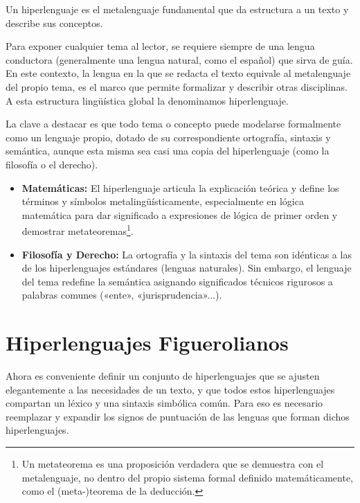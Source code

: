 \documentclass[12pt]{report}
\begin{document}
	\begin{minidefin}
		Un hiperlenguaje es el metalenguaje fundamental que da estructura a un texto y describe sus conceptos.
	\end{minidefin}
	
	Para exponer cualquier tema al lector, se requiere siempre de una lengua conductora (generalmente una lengua natural, como el español) que sirva de guía. En este contexto, la lengua en la que se redacta el texto equivale al metalenguaje del propio tema, es el marco que permite formalizar y describir otras disciplinas. A esta estructura lingüística global la denominamos hiperlenguaje.
	
	La clave a destacar es que todo tema o concepto puede modelarse formalmente como un lenguaje propio, dotado de su correspondiente ortografía, sintaxis y semántica, aunque esta misma sea casi una copia del hiperlenguaje (como la filosofía o el derecho).
	
	\begin{subminibloque}[Ejemplos]
		\begin{itemize}
			\item \textbf{Matemáticas:} 
			El hiperlenguaje articula la explicación teórica y define los términos y símbolos metalingüísticamente, especialmente en lógica matemática para dar significado a expresiones de lógica de primer orden y demostrar metateoremas\footnote{Un metateorema es una proposición verdadera que se demuestra con el metalenguaje, no dentro del propio sistema formal definido matemáticamente, como el (meta-)teorema de la deducción.}.
			
			\item \textbf{Filosofía y Derecho:} 
			La ortografía y la sintaxis del tema son idénticas a las de los hiperlenguajes estándares (lenguas naturales). Sin embargo, el lenguaje del tema redefine la semántica asignando significados técnicos rigurosos a palabras comunes («ente», «jurisprudencia»...).
		\end{itemize}
	\end{subminibloque}

	
	
	
	\section{Hiperlenguajes Figuerolianos}
	
	Ahora es conveniente definir un conjunto de hiperlenguajes que se ajusten elegantemente a las necesidades de un texto, y que todos estos hiperlenguajes compartan un léxico y una sintaxis simbólica común. Para eso es necesario reemplazar y expandir los signos de puntuación de las lenguas que forman dichos hiperlenguajes.
	
\end{document}
